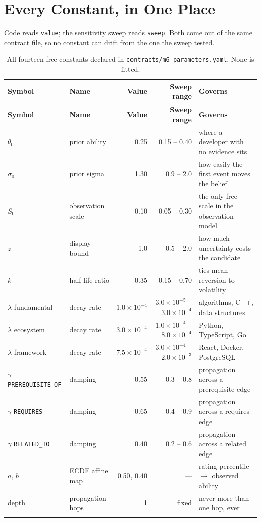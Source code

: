 \documentclass[11pt,a4paper]{article}
\begin{document}
\section{Every Constant, in One Place}

Code reads \texttt{value}; the sensitivity sweep reads \texttt{sweep}. Both
come out of the same contract file, so no constant can drift from the one
the sweep tested.

{\small
\begin{longtable}{@{}lL{3.0cm}rrL{4.0cm}@{}}
\toprule
\textbf{Symbol} & \textbf{Name} & \textbf{Value} & \textbf{Sweep range} & \textbf{Governs} \\
\midrule
\endfirsthead
\toprule
\textbf{Symbol} & \textbf{Name} & \textbf{Value} & \textbf{Sweep range} & \textbf{Governs} \\
\midrule
\endhead
$\theta_0$ & prior ability      & 0.25    & 0.15 -- 0.40   & where a developer with no evidence sits \\
$\sigma_0$ & prior sigma        & 1.30    & 0.9 -- 2.0     & how easily the first event moves the belief \\
$S_0$      & observation scale  & 0.10    & 0.05 -- 0.30   & the only free scale in the observation model \\
$z$        & display bound      & 1.0     & 0.5 -- 2.0     & how much uncertainty costs the candidate \\
$k$        & half-life ratio    & 0.35    & 0.15 -- 0.70   & ties mean-reversion to volatility \\
$\lambda$ fundamental & decay rate & $1.0{\times}10^{-4}$ & $3.0{\times}10^{-5}$ -- $3.0{\times}10^{-4}$ & algorithms, C++, data structures \\
$\lambda$ ecosystem   & decay rate & $3.0{\times}10^{-4}$ & $1.0{\times}10^{-4}$ -- $8.0{\times}10^{-4}$ & Python, TypeScript, Go \\
$\lambda$ framework   & decay rate & $7.5{\times}10^{-4}$ & $3.0{\times}10^{-4}$ -- $2.0{\times}10^{-3}$ & React, Docker, PostgreSQL \\
$\gamma$ \texttt{PREREQUISITE\_OF} & damping & 0.55 & 0.3 -- 0.8 & propagation across a prerequisite edge \\
$\gamma$ \texttt{REQUIRES}         & damping & 0.65 & 0.4 -- 0.9 & propagation across a requires edge \\
$\gamma$ \texttt{RELATED\_TO}      & damping & 0.40 & 0.2 -- 0.6 & propagation across a related edge \\
$a,\,b$    & ECDF affine map    & 0.50, 0.40 & --- & rating percentile $\to$ observed ability \\
depth      & propagation hops   & 1       & fixed & never more than one hop, ever \\
\bottomrule
\caption{All fourteen free constants declared in
\texttt{contracts/m6-parameters.yaml}. None is fitted.}
\end{longtable}
}
\end{document}
